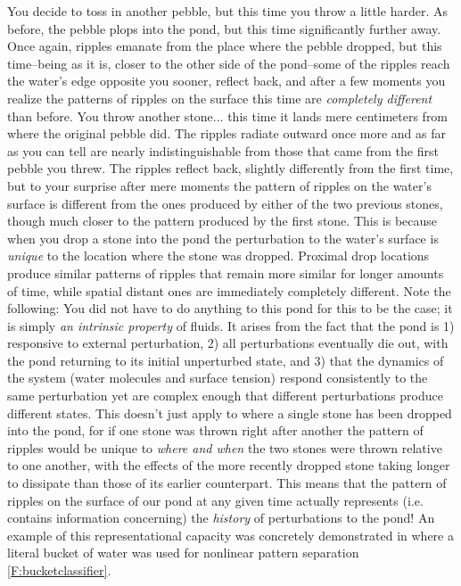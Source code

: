 You decide to toss in another pebble, but this time you throw a little harder. As before, the pebble plops into the pond, but this time significantly further away. Once again, ripples emanate from the place where the pebble dropped, but this time--being as it is, closer to the other side of the pond--some of the ripples reach the water's edge opposite you sooner, reflect back, and after a few moments you realize the patterns of ripples on the surface this time are \emph{completely different} than before. You throw another stone... this time it lands mere centimeters from where the original pebble did. The ripples radiate outward once more and as far as you can tell are nearly indistinguishable from those that came from the first pebble you threw. The ripples reflect back, slightly differently from the first time, but to your surprise after mere moments the pattern of ripples on the water's surface is different from the ones produced by either of the two previous stones, though much closer to the pattern produced by the first stone. This is because when you drop a stone into the pond the perturbation to the water's surface is \emph{unique} to the location where the stone was dropped. Proximal drop locations produce similar patterns of ripples that remain more similar for longer amounts of time, while spatial distant ones are immediately completely different. Note the following: You did not have to do anything to this pond for this to be the case; it is simply \emph{an intrinsic property} of fluids. It arises from the fact that the pond is 1) responsive to external perturbation, 2) all perturbations eventually die out, with the pond returning to its initial unperturbed state, and 3) that the dynamics of the system (water molecules and surface tension) respond consistently to the same perturbation yet are complex enough that different perturbations produce different states. This doesn't just apply to where a single stone has been dropped into the pond, for if one stone was thrown right after another the pattern of ripples would be unique to \emph{where and when} the two stones were thrown relative to one another, with the effects of the more recently dropped stone taking longer to dissipate than those of its earlier counterpart. This means that the pattern of ripples on the surface of our pond at any given time actually represents (i.e. contains information concerning) the \emph{history} of perturbations to the pond! An example of this representational capacity was concretely demonstrated in \cite{fernando2003pattern} where a literal bucket of water was used for nonlinear pattern separation \ref{F:bucketclassifier}.

